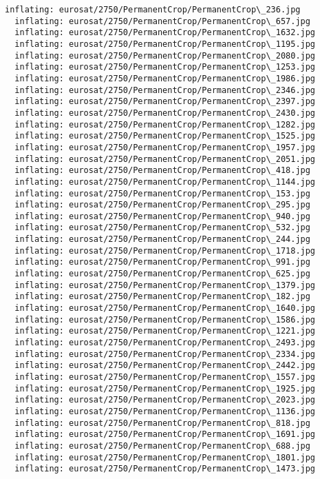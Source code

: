 \documentclass[11pt]{article}
\begin{document}
\begin{Verbatim}[commandchars=\\\{\}]
  inflating: eurosat/2750/PermanentCrop/PermanentCrop\_236.jpg
  inflating: eurosat/2750/PermanentCrop/PermanentCrop\_657.jpg
  inflating: eurosat/2750/PermanentCrop/PermanentCrop\_1632.jpg
  inflating: eurosat/2750/PermanentCrop/PermanentCrop\_1195.jpg
  inflating: eurosat/2750/PermanentCrop/PermanentCrop\_2080.jpg
  inflating: eurosat/2750/PermanentCrop/PermanentCrop\_1253.jpg
  inflating: eurosat/2750/PermanentCrop/PermanentCrop\_1986.jpg
  inflating: eurosat/2750/PermanentCrop/PermanentCrop\_2346.jpg
  inflating: eurosat/2750/PermanentCrop/PermanentCrop\_2397.jpg
  inflating: eurosat/2750/PermanentCrop/PermanentCrop\_2430.jpg
  inflating: eurosat/2750/PermanentCrop/PermanentCrop\_1282.jpg
  inflating: eurosat/2750/PermanentCrop/PermanentCrop\_1525.jpg
  inflating: eurosat/2750/PermanentCrop/PermanentCrop\_1957.jpg
  inflating: eurosat/2750/PermanentCrop/PermanentCrop\_2051.jpg
  inflating: eurosat/2750/PermanentCrop/PermanentCrop\_418.jpg
  inflating: eurosat/2750/PermanentCrop/PermanentCrop\_1144.jpg
  inflating: eurosat/2750/PermanentCrop/PermanentCrop\_153.jpg
  inflating: eurosat/2750/PermanentCrop/PermanentCrop\_295.jpg
  inflating: eurosat/2750/PermanentCrop/PermanentCrop\_940.jpg
  inflating: eurosat/2750/PermanentCrop/PermanentCrop\_532.jpg
  inflating: eurosat/2750/PermanentCrop/PermanentCrop\_244.jpg
  inflating: eurosat/2750/PermanentCrop/PermanentCrop\_1718.jpg
  inflating: eurosat/2750/PermanentCrop/PermanentCrop\_991.jpg
  inflating: eurosat/2750/PermanentCrop/PermanentCrop\_625.jpg
  inflating: eurosat/2750/PermanentCrop/PermanentCrop\_1379.jpg
  inflating: eurosat/2750/PermanentCrop/PermanentCrop\_182.jpg
  inflating: eurosat/2750/PermanentCrop/PermanentCrop\_1640.jpg
  inflating: eurosat/2750/PermanentCrop/PermanentCrop\_1586.jpg
  inflating: eurosat/2750/PermanentCrop/PermanentCrop\_1221.jpg
  inflating: eurosat/2750/PermanentCrop/PermanentCrop\_2493.jpg
  inflating: eurosat/2750/PermanentCrop/PermanentCrop\_2334.jpg
  inflating: eurosat/2750/PermanentCrop/PermanentCrop\_2442.jpg
  inflating: eurosat/2750/PermanentCrop/PermanentCrop\_1557.jpg
  inflating: eurosat/2750/PermanentCrop/PermanentCrop\_1925.jpg
  inflating: eurosat/2750/PermanentCrop/PermanentCrop\_2023.jpg
  inflating: eurosat/2750/PermanentCrop/PermanentCrop\_1136.jpg
  inflating: eurosat/2750/PermanentCrop/PermanentCrop\_818.jpg
  inflating: eurosat/2750/PermanentCrop/PermanentCrop\_1691.jpg
  inflating: eurosat/2750/PermanentCrop/PermanentCrop\_688.jpg
  inflating: eurosat/2750/PermanentCrop/PermanentCrop\_1801.jpg
  inflating: eurosat/2750/PermanentCrop/PermanentCrop\_1473.jpg

\end{Verbatim}
\end{document}
